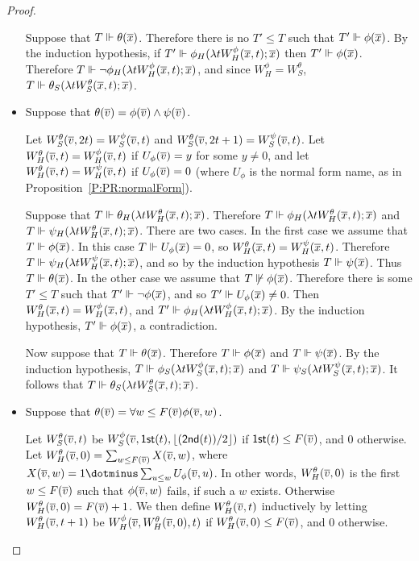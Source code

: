 \begin{proof}
\begin{itemize}
Suppose that $T\Vdash\theta(\overline{x})$.
Therefore there is no $T'\leq T$ such that $T'\Vdash\phi(\overline{x})$.
By the induction hypothesis, if
$T'\Vdash\phi_H(\lambda tW_H^\phi(\overline{x},t);\overline{x})$
then $T'\Vdash\phi(\overline{x})$.
Therefore $T\Vdash\neg\phi_H(\lambda tW_H^\phi(\overline{x},t);\overline{x})$,
and since $W^\phi_H=W^\theta_S$, $T\Vdash\theta_S(\lambda tW_S^\theta(\overline{x},t);\overline{x})$.

\item Suppose that $\theta(\overline{v})=\phi(\overline{v})\land\psi(\overline{v})$.

Let $W^\theta_S(\overline{v},2t)=W^\phi_S(\overline{v},t)$ and
$W^\theta_S(\overline{v},2t+1)=W^\psi_S(\overline{v},t)$.
Let $W^\theta_H(\overline{v},t)=W^\phi_H(\overline{v},t)$ if $U_\phi(\overline{v})=y$ for some $y\neq 0$,
and let $W^\theta_H(\overline{v},t)=W^\psi_H(\overline{v},t)$ if $U_\phi(\overline{v})=0$
(where $U_\phi$ is the normal form name, as in Proposition~\ref{P:PR:normalForm}).

Suppose that $T\Vdash\theta_H(\lambda tW_H^\theta(\overline{x},t);\overline{x})$.
Therefore $T\Vdash\phi_H(\lambda tW_H^\theta(\overline{x},t);\overline{x})$ and
$T\Vdash\psi_H(\lambda tW_H^\theta(\overline{x},t);\overline{x})$.
There are two cases.
In the first case we assume that $T\Vdash\phi(\overline{x})$.
In this case $T\Vdash U_\phi(\overline{x})=0$, so
$W^\theta_H(\overline{x},t)=W^\psi_H(\overline{x},t)$.
Therefore $T\Vdash\psi_H(\lambda tW_H^\psi(\overline{x},t);\overline{x})$,
and so by the induction hypothesis $T\Vdash\psi(\overline{x})$.
Thus $T\Vdash\theta(\overline{x})$.
In the other case we assume that $T\not\Vdash\phi(\overline{x})$.
Therefore there is some $T'\leq T$ such that $T'\Vdash\neg\phi(\overline{x})$,
and so $T'\Vdash U_\phi(\overline{x})\neq 0$.
Then $W^\theta_H(\overline{x},t)=W^\phi_H(\overline{x},t)$,
and $T'\Vdash\phi_H(\lambda tW_H^\phi(\overline{x},t);\overline{x})$.
By the induction hypothesis, $T'\Vdash\phi(\overline{x})$, a contradiction.

Now suppose that $T\Vdash\theta(\overline{x})$.
Therefore $T\Vdash\phi(\overline{x})$ and $T\Vdash\psi(\overline{x})$.
By the induction hypothesis, $T\Vdash\phi_S(\lambda tW_S^\phi(\overline{x},t);\overline{x})$
and $T\Vdash\psi_S(\lambda tW_S^\psi(\overline{x},t);\overline{x})$.
It follows that $T\Vdash\theta_S(\lambda tW_S^\theta(\overline{x},t);\overline{x})$.

\item Suppose that $\theta(\overline{v})=\forall w\leq F(\overline{v})\phi(\overline{v},w)$.

Let $W^\theta_S(\overline{v},t)$ be $W^\phi_S(\overline{v},\mathsf{1st}(t),\lfloor(\mathsf{2nd}(t))/2\rfloor)$
if $\mathsf{1st}(t)\leq F(\overline{v})$, and $0$ otherwise.
Let $W^\theta_H(\overline{v},0)=\sum_{w\leq F(\overline{v})}X(\overline{v},w)$,
where $X(\tup{v},w)=1\dotminus \sum_{u\leq w}U_\phi(\tup{v},u)$.
In other words, $W^\theta_H(\overline{v},0)$ is the first $w\leq F(\overline{v})$
such that $\phi(\overline{v},w)$ fails, if such a $w$ exists.
Otherwise $W^\theta_H(\overline{v},0)=F(\overline{v})+1$.
We then define $W^\theta_H(\overline{v},t)$ inductively
by letting $W^\theta_H(\overline{v},t+1)$ be $W^\phi_H(\overline{v},W^\theta_H(\overline{v},0),t)$
if $W^\theta_H(\overline{v},0)\leq F(\overline{v})$, and $0$ otherwise.


\end{itemize}
\end{proof}
